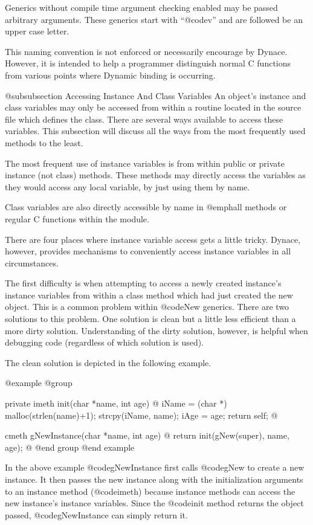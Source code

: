 Generics without compile time argument checking enabled may be passed
arbitrary arguments.  These generics start with ``@code{v}'' and are
followed be an upper case letter.

This naming convention is not enforced or necessarily encourage by
Dynace.  However, it is intended to help a programmer distinguish normal
C functions from various points where Dynamic binding is occurring.


@subsubsection Accessing Instance And Class Variables
An object's instance and class variables may only be accessed from
within a routine located in the source file which defines the class.
There are several ways available to access these variables.  This
subsection will discuss all the ways from the most frequently used
methods to the least.

The most frequent use of instance variables is from within public or
private instance (not class) methods.  These methods may directly access
the variables as they would access any local variable, by just using
them by name.

Class variables are also directly accessible by name in @emph{all}
methods or regular C functions within the module.

There are four places where instance variable access gets a little tricky.
Dynace, however, provides mechanisms to conveniently access instance
variables in all circumstances.

The first difficulty is when attempting to access a newly created instance's
instance variables from within a class method which had just created the
new object.  This is a common problem within @code{New} generics.  There
are two solutions to this problem.  One solution is clean but a little
less efficient than a more dirty solution.  Understanding of the dirty
solution, however, is helpful when debugging code (regardless of which
solution is used).

The clean solution is depicted in the following example.

@example
@group

private imeth  init(char *name, int age)
@{
        iName = (char *) malloc(strlen(name)+1);
        strcpy(iName, name);
        iAge = age;
        return self;
@}

cmeth   gNewInstance(char *name, int age)
@{
        return init(gNew(super), name, age);
@}
@end group
@end example

In the above example @code{gNewInstance} first calls @code{gNew} to
create a new instance.  It then passes the new instance along with the
initialization arguments to an instance method (@code{imeth}) because
instance methods can access the new instance's instance variables.
Since the @code{init} method returns the object passed, @code{gNewInstance}
can simply return it.

